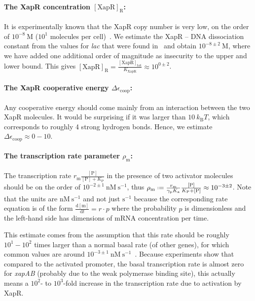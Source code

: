\documentclass[10pt,letterpaper]{article}
\newcommand{\n}[1]{\mathrm{#1}}
\newcommand{\dd}[2]{\frac{\mathrm{d} #1}{\mathrm{d} #2}}
\newcommand*{\defeq}{\mathrel{\vcenter{\baselineskip0.5ex \lineskiplimit0pt
			\hbox{\scriptsize.}\hbox{\scriptsize.}}}%
	=}
\begin{document}
\paragraph*{The XapR concentration $\n{[XapR]_R}$:} 
It is experimentally known that the XapR copy number is very low, on the order of $10^{-8}~\n{M}$ ($10^1$ molecules per cell)~\cite{Li2014}. We estimate the XapR -- DNA dissociation constant from the values for \emph{lac} that were found in~\cite{RazoMejia2018} and obtain $10^{-8 \pm 2}~\n{M}$, where we have added one additional order of magnitude as insecurity to the upper and lower bound. This gives $\n{[XapR]_R}=\frac{\n{[XapR]_{\n{tot}}}}{K_{\n{XapR}}} \approx 10^{0 \pm 2}$.

\paragraph*{The XapR cooperative energy $\Delta \epsilon_{\n{coop}}$:}
Any cooperative energy should come mainly from an interaction between the two XapR molecules. It would be surprising if it was larger than $10 \ k_{\n{B}} T$, which corresponds to roughly 4 strong hydrogen bonds. Hence, we estimate $\Delta \epsilon_{\n{coop}} \approx 0 - 10$.

\paragraph*{The transcription rate parameter $\rho_{\n{m}}$:} The transcription rate $r_{\n{m}} \frac{\n{[P]}}{\n{[P]} + K_{\n{P}}}$ in the presence of two activator molecules should be on the order of $10^{-2 \pm 1}~\n{nM\ s^{-1}}$, thus $\rho_{\n{m}} \defeq \frac{r_{\n{m}}}{\gamma_{\n{p}} K_{\n{a}}} \frac{\n{[P]}}{K_{\n{P}}+\n{[P]}} \approx 10^{-3 \pm 2}$. Note that the units are $\n{nM\ s^{-1}}$ and not just $\n{s^{-1}}$ because the corresponding rate equation is of the form $\dd{\n{[m]}}{t} = r \cdot p$ where the probability $p$ is dimensionless and the left-hand side has dimensions of mRNA concentration per time. 

This estimate comes from the assumption that this rate should be roughly $10^{1} - 10^{2}$ times larger than a normal basal rate (of other genes), for which common values are around $10^{-3 \pm 1}~\n{nM\ s^{-1}}$~\cite{Milo2016}. Because experiments show that compared to the activated promoter, the basal transcription rate is almost zero for \emph{xapAB} (probably due to the weak polymerase binding site), this actually means a $10^{2}$- to $10^{3}$-fold increase in the transcription rate due to activation by XapR. 
\end{document}
